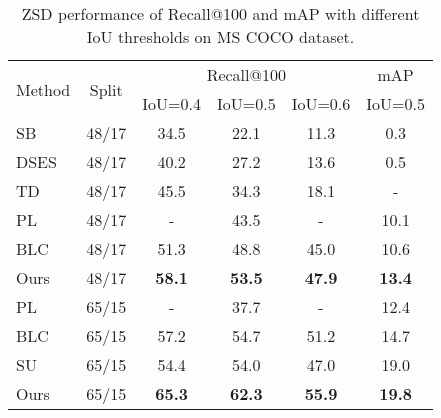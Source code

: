 \documentclass[10pt,twocolumn,letterpaper]{article}
\begin{document}
\begin{table}[t]
  \centering

  \caption{ZSD performance of Recall@100 and mAP with different IoU thresholds on MS COCO dataset.}
\renewcommand\tabcolsep{3.6pt}
    \begin{tabular}{lccccc}
    \toprule
    \multirow{2}[4]{*}{Method} & \multirow{2}[4]{*}{Split} & \multicolumn{3}{c}{Recall@100} & mAP \\
\cmidrule(r){3-5}   \cmidrule(r){6-6}       &       & IoU=0.4   & IoU=0.5   & IoU=0.6   & IoU=0.5 \\
    \midrule
    SB \cite{bansal2018zero}   & 48/17 & 34.5     & 22.1     & 11.3     & 0.3 \\
    DSES \cite{bansal2018zero}   & 48/17 & 40.2     & 27.2     & 13.6     & 0.5 \\
    TD \cite{li2019zero}   & 48/17 & 45.5     & 34.3     & 18.1     & - \\
    PL \cite{rahman2020improved}   & 48/17 & -     & 43.5     & -     & 10.1 \\
    BLC \cite{zheng2020background}  & 48/17 & 51.3     & 48.8     & 45.0     & 10.6 \\
    Ours  & 48/17 & \textbf{58.1}     & \textbf{53.5}     & \textbf{47.9}     & \textbf{13.4} \\
    \midrule
    PL \cite{rahman2020improved}   & 65/15  & -     & 37.7     & -     & 12.4 \\
    BLC \cite{zheng2020background}   & 65/15 & 57.2     & 54.7     & 51.2     & 14.7 \\
    SU \cite{hayat2020synthesizing}  & 65/15 & 54.4     & 54.0     & 47.0     & 19.0 \\
    Ours  & 65/15 & \textbf{65.3}     & \textbf{62.3}     & \textbf{55.9}     & \textbf{19.8} \\
    \bottomrule
    \end{tabular}\label{zsd-coco}\end{table}\begin{table}[t]
  \centering


\end{table}
\end{document}
